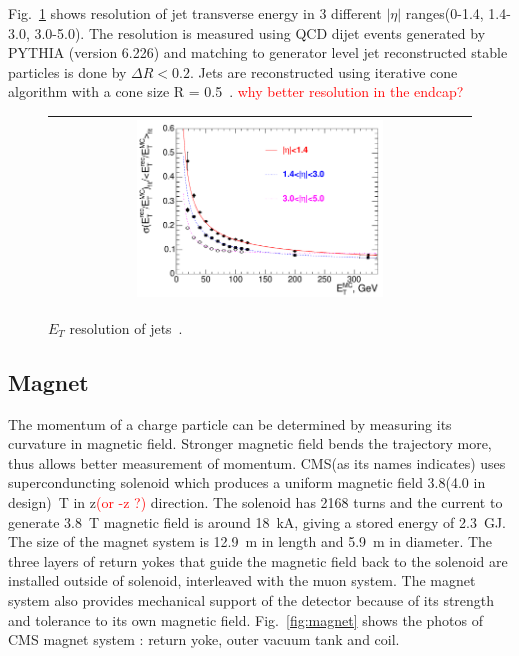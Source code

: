 Fig.~\ref{fig:hcal_res} shows resolution of jet transverse energy 
in 3 different $|\eta|$ ranges(0-1.4, 1.4-3.0, 3.0-5.0). 
The resolution is measured using QCD dijet events generated by PYTHIA (version 6.226)
and matching to generator level jet reconstructed stable particles is done by $\Delta R < 0.2$. 
Jets are reconstructed using iterative cone algorithm with a cone size R = 0.5~\cite{}. 
\textcolor{red}{why better resolution in the endcap?}
%
\begin{figure}[h] 
\vspace{1cm}
\centering 
\begin{tabular}{|c|} 
\hline
\includegraphics[width=0.6\textwidth]{figures/Figure_001-008.pdf}\\
\hline
\end{tabular} 
\caption{$E_T$ resolution of jets~\cite{cmstdr1}.}
\label{fig:hcal_res} 
\end{figure} 




\subsection{Magnet} 

The momentum of a charge particle can be determined by measuring 
its curvature in magnetic field. Stronger magnetic field bends   
the trajectory more, thus allows better measurement of momentum.
CMS(as its names indicates) uses superconduncting solenoid 
which produces a uniform magnetic field  3.8(4.0 in design)~T 
in z\textcolor{red}{(or -z ?)} direction.  
The solenoid has 2168 turns and the current to generate 3.8~T magnetic field  
is around 18~kA, giving a stored energy of 2.3~GJ. 
The size of the magnet system is 12.9~m in length and 5.9~m in diameter. 
The three layers of return yokes that guide the magnetic field back to the solenoid 
are installed outside of solenoid, interleaved with the muon system. 
The magnet system also provides mechanical support of the detector
because of its strength and tolerance to its own magnetic field. 
Fig.~\ref{fig:magnet} shows the photos of CMS magnet system : 
return yoke, outer vacuum tank and coil. 

